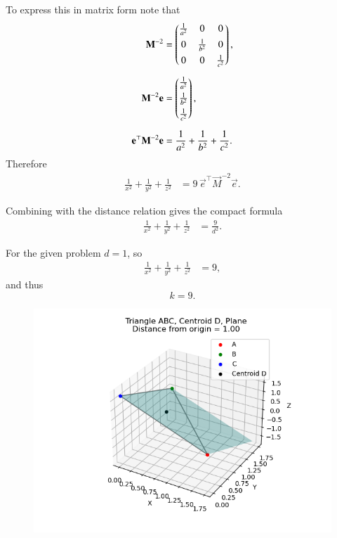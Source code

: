\documentclass[journal]{IEEEtran}
\begin{document}
To express this in matrix form note that
\begin{align}
\mathbf{M}^{-2} &= \begin{pmatrix}\tfrac{1}{a^2}&0&0\\[4pt]0&\tfrac{1}{b^2}&0\\[4pt]0&0&\tfrac{1}{c^2}\end{pmatrix}, \\[6pt]
\mathbf{M}^{-2}\mathbf{e} &= \begin{pmatrix}\tfrac{1}{a^2}\\[4pt]\tfrac{1}{b^2}\\[4pt]\tfrac{1}{c^2}\end{pmatrix}, \\[6pt]
\mathbf{e}^\top \mathbf{M}^{-2}\mathbf{e} &= \frac{1}{a^2}+\frac{1}{b^2}+\frac{1}{c^2}.
\end{align}
Therefore
\begin{align}
\frac{1}{x^2}+\frac{1}{y^2}+\frac{1}{z^2}
&= 9\,\vec{e}^\top \vec{M}^{-2}\vec{e}.
\end{align}

Combining with the distance relation gives the compact formula
\begin{align}
\frac{1}{x^2}+\frac{1}{y^2}+\frac{1}{z^2} &= \frac{9}{d^2}.
\end{align}

For the given problem \(d=1\), so
\begin{align}
\frac{1}{x^2}+\frac{1}{y^2}+\frac{1}{z^2} &= 9,
\end{align}
and thus
\[
\boxed{k=9}.
\]

\begin{figure}[H]
    \centering
    \includegraphics[width=0.8\linewidth]{figs/fig1.png}
    \caption{}
    \label{fig:fig1}
\end{figure}
\end{document}

